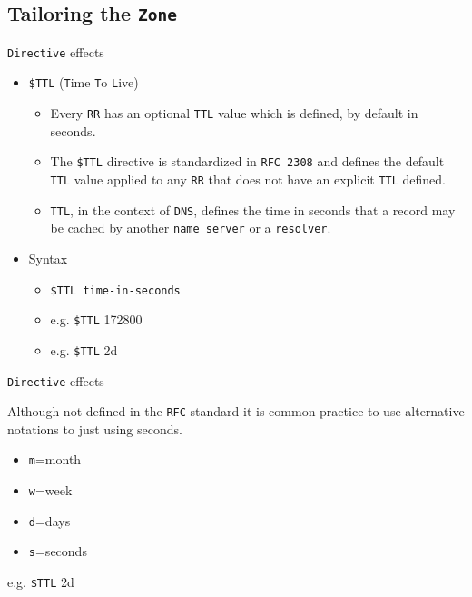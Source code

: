 \documentclass[xcolor=table]{beamer}
\begin{document}
\subsection{Tailoring the \texttt{Zone}}
\begin{frame}{\texttt{Directive} effects}
  \begin{itemize}
    \item \texttt{\$TTL} (\texttt{T}ime \texttt{T}o \texttt{L}ive)
       \begin{itemize}
          \item Every \texttt{RR} has an optional \texttt{TTL} value which is defined, by default in seconds.
          \item The \texttt{\$TTL} directive is standardized in \texttt{RFC 2308} and defines the default \texttt{TTL} value applied to any \texttt{RR} that does not have an explicit \texttt{TTL} defined. 
          \item \texttt{TTL}, in the context of \texttt{DNS}, defines the time in seconds that a record may be cached by another \texttt{name server} or a \texttt{resolver}.
       \end{itemize}
    \item Syntax
       \begin{itemize}
          \item \texttt{\$TTL time-in-seconds}
          \item e.g. \texttt{\$TTL} 172800
          \item e.g. \texttt{\$TTL} 2d
       \end{itemize}
  \end{itemize}
\end{frame}

\begin{frame}{\texttt{Directive} effects}
  \begin{tcolorbox}[title={\textbf{NOTE:}}]
    Although not defined in the \texttt{RFC} standard it is common practice to use alternative notations to just using seconds.
    \begin{itemize}
      \item \texttt{m}=month
      \item \texttt{w}=week
      \item \texttt{d}=days
      \item \texttt{s}=seconds
    \end{itemize}
    e.g. \texttt{\$TTL} 2d
  \end{tcolorbox}
\end{frame}
\end{document}
